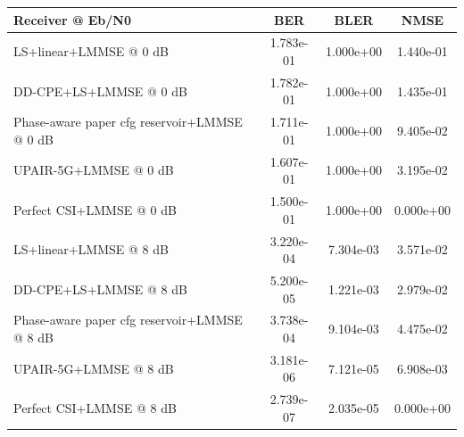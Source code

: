 \begin{tabular}{lccc}
\toprule
Receiver @ Eb/N0 & BER & BLER & NMSE \\
\midrule
LS+linear+LMMSE @ 0 dB & 1.783e-01 & 1.000e+00 & 1.440e-01 \\
DD-CPE+LS+LMMSE @ 0 dB & 1.782e-01 & 1.000e+00 & 1.435e-01 \\
Phase-aware paper cfg reservoir+LMMSE @ 0 dB & 1.711e-01 & 1.000e+00 & 9.405e-02 \\
UPAIR-5G+LMMSE @ 0 dB & 1.607e-01 & 1.000e+00 & 3.195e-02 \\
Perfect CSI+LMMSE @ 0 dB & 1.500e-01 & 1.000e+00 & 0.000e+00 \\
\midrule
LS+linear+LMMSE @ 8 dB & 3.220e-04 & 7.304e-03 & 3.571e-02 \\
DD-CPE+LS+LMMSE @ 8 dB & 5.200e-05 & 1.221e-03 & 2.979e-02 \\
Phase-aware paper cfg reservoir+LMMSE @ 8 dB & 3.738e-04 & 9.104e-03 & 4.475e-02 \\
UPAIR-5G+LMMSE @ 8 dB & 3.181e-06 & 7.121e-05 & 6.908e-03 \\
Perfect CSI+LMMSE @ 8 dB & 2.739e-07 & 2.035e-05 & 0.000e+00 \\
\bottomrule
\end{tabular}